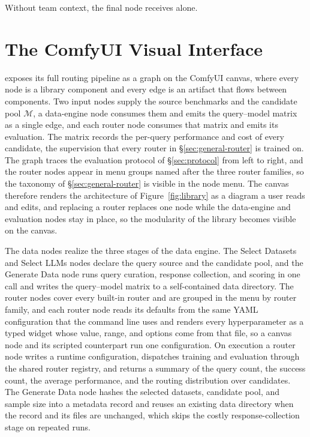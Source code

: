 Without team context, the final node receives  alone.









\section{The ComfyUI Visual Interface} \label{app:comfyui}

\method exposes its full routing pipeline as a graph on the ComfyUI canvas, where every node is a library component and every edge is an artifact that flows between components. Two input nodes supply the source benchmarks and the candidate pool $\mathcal{M}$, a data-engine node consumes them and emits the query--model matrix as a single edge, and each router node consumes that matrix and emits its evaluation. The matrix records the per-query performance and cost of every candidate, the supervision that every router in \S\ref{sec:general-router} is trained on. The graph traces the evaluation protocol of \S\ref{sec:protocol} from left to right, and the router nodes appear in menu groups named after the three router families, so the taxonomy of \S\ref{sec:general-router} is visible in the node menu. The canvas therefore renders the architecture of Figure~\ref{fig:library} as a diagram a user reads and edits, and replacing a router replaces one node while the data-engine and evaluation nodes stay in place, so the modularity of the library becomes visible on the canvas.

The data nodes realize the three stages of the data engine. The Select Datasets and Select LLMs nodes declare the query source and the candidate pool, and the Generate Data node runs query curation, response collection, and scoring in one call and writes the query--model matrix to a self-contained data directory. The router nodes cover every built-in router and are grouped in the menu by router family, and each router node reads its defaults from the same YAML configuration that the command line uses and renders every hyperparameter as a typed widget whose value, range, and options come from that file, so a canvas node and its scripted counterpart run one configuration. On execution a router node writes a runtime configuration, dispatches training and evaluation through the shared router registry, and returns a summary of the query count, the success count, the average performance, and the routing distribution over candidates. The Generate Data node hashes the selected datasets, candidate pool, and sample size into a metadata record and reuses an existing data directory when the record and its files are unchanged, which skips the costly response-collection stage on repeated runs.

